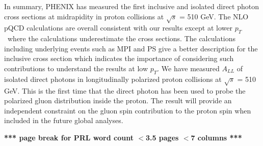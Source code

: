 \documentclass[twocolumn,letterpaper,aps,prl,longbibliography,superscriptaddress,floatfix]{revtex4-2}
\newcommand{\pT}{\ensuremath{p_T}}
\begin{document}
In summary, PHENIX has measured the first inclusive and isolated direct photon cross sections at midrapidity in proton collisions at $\sqrt{s}$ = 510 GeV. The NLO pQCD calculations are overall consistent with our results except at lower \pT\ where the calculations underestimate the cross sections. The calculations including underlying events such as MPI and PS give a better description for the inclusive cross section which indicates the importance of considering such contributions to understand the results at low $p_{T}$. We have measured $A_{LL}$ of isolated direct photons in longitudinally polarized proton collisions at $\sqrt{s}$ = 510 GeV. This is the first time that the direct photon has been used to probe the polarized gluon distribution inside the proton. The result will provide an independent constraint on the gluon spin contribution to the proton spin when included in the future global analyses.

\clearpage \textbf{*** page break for PRL word count $<$3.5 pages $<$7 columns ***}




\end{document}
